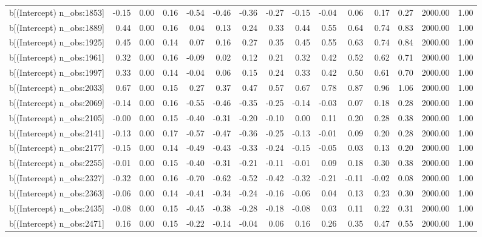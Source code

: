 \begin{table}[ht]
\begin{tabular}{rrrrrrrrrrrrrrr}
  b[(Intercept) n\_obs:1853] & -0.15 & 0.00 & 0.16 & -0.54 & -0.46 & -0.36 & -0.27 & -0.15 & -0.04 & 0.06 & 0.17 & 0.27 & 2000.00 & 1.00 \\ 
  b[(Intercept) n\_obs:1889] & 0.44 & 0.00 & 0.16 & 0.04 & 0.13 & 0.24 & 0.33 & 0.44 & 0.55 & 0.64 & 0.74 & 0.83 & 2000.00 & 1.00 \\ 
  b[(Intercept) n\_obs:1925] & 0.45 & 0.00 & 0.14 & 0.07 & 0.16 & 0.27 & 0.35 & 0.45 & 0.55 & 0.63 & 0.74 & 0.84 & 2000.00 & 1.00 \\ 
  b[(Intercept) n\_obs:1961] & 0.32 & 0.00 & 0.16 & -0.09 & 0.02 & 0.12 & 0.21 & 0.32 & 0.42 & 0.52 & 0.62 & 0.71 & 2000.00 & 1.00 \\ 
  b[(Intercept) n\_obs:1997] & 0.33 & 0.00 & 0.14 & -0.04 & 0.06 & 0.15 & 0.24 & 0.33 & 0.42 & 0.50 & 0.61 & 0.70 & 2000.00 & 1.00 \\ 
  b[(Intercept) n\_obs:2033] & 0.67 & 0.00 & 0.15 & 0.27 & 0.37 & 0.47 & 0.57 & 0.67 & 0.78 & 0.87 & 0.96 & 1.06 & 2000.00 & 1.00 \\ 
  b[(Intercept) n\_obs:2069] & -0.14 & 0.00 & 0.16 & -0.55 & -0.46 & -0.35 & -0.25 & -0.14 & -0.03 & 0.07 & 0.18 & 0.28 & 2000.00 & 1.00 \\ 
  b[(Intercept) n\_obs:2105] & -0.00 & 0.00 & 0.15 & -0.40 & -0.31 & -0.20 & -0.10 & 0.00 & 0.11 & 0.20 & 0.28 & 0.38 & 2000.00 & 1.00 \\ 
  b[(Intercept) n\_obs:2141] & -0.13 & 0.00 & 0.17 & -0.57 & -0.47 & -0.36 & -0.25 & -0.13 & -0.01 & 0.09 & 0.20 & 0.28 & 2000.00 & 1.00 \\ 
  b[(Intercept) n\_obs:2177] & -0.15 & 0.00 & 0.14 & -0.49 & -0.43 & -0.33 & -0.24 & -0.15 & -0.05 & 0.03 & 0.13 & 0.20 & 2000.00 & 1.00 \\ 
  b[(Intercept) n\_obs:2255] & -0.01 & 0.00 & 0.15 & -0.40 & -0.31 & -0.21 & -0.11 & -0.01 & 0.09 & 0.18 & 0.30 & 0.38 & 2000.00 & 1.00 \\ 
  b[(Intercept) n\_obs:2327] & -0.32 & 0.00 & 0.16 & -0.70 & -0.62 & -0.52 & -0.42 & -0.32 & -0.21 & -0.11 & -0.02 & 0.08 & 2000.00 & 1.00 \\ 
  b[(Intercept) n\_obs:2363] & -0.06 & 0.00 & 0.14 & -0.41 & -0.34 & -0.24 & -0.16 & -0.06 & 0.04 & 0.13 & 0.23 & 0.30 & 2000.00 & 1.00 \\ 
  b[(Intercept) n\_obs:2435] & -0.08 & 0.00 & 0.15 & -0.45 & -0.38 & -0.28 & -0.18 & -0.08 & 0.03 & 0.11 & 0.22 & 0.31 & 2000.00 & 1.00 \\ 
  b[(Intercept) n\_obs:2471] & 0.16 & 0.00 & 0.15 & -0.22 & -0.14 & -0.04 & 0.06 & 0.16 & 0.26 & 0.35 & 0.47 & 0.55 & 2000.00 & 1.00 \\ 

\end{tabular}
\end{table}
